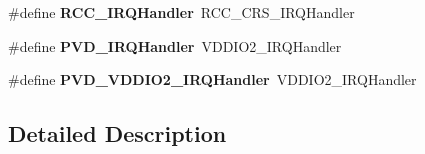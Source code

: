 \begin{DoxyCompactItemize}
\item 
\mbox{\label{group__stm32f048xx_ga5a6d083fa78461da86a717b28973e009}} 
\#define {\bfseries R\+C\+C\+\_\+\+I\+R\+Q\+Handler}~R\+C\+C\+\_\+\+C\+R\+S\+\_\+\+I\+R\+Q\+Handler
\item 
\mbox{\label{group__stm32f048xx_ga045476dfaec8c84f5e16b06b937c0c18}} 
\#define {\bfseries P\+V\+D\+\_\+\+I\+R\+Q\+Handler}~V\+D\+D\+I\+O2\+\_\+\+I\+R\+Q\+Handler
\item 
\mbox{\label{group__stm32f048xx_ga9a2577324b65f147fff0fc4f38dcf5e2}} 
\#define {\bfseries P\+V\+D\+\_\+\+V\+D\+D\+I\+O2\+\_\+\+I\+R\+Q\+Handler}~V\+D\+D\+I\+O2\+\_\+\+I\+R\+Q\+Handler
\end{DoxyCompactItemize}


\subsection{Detailed Description}

